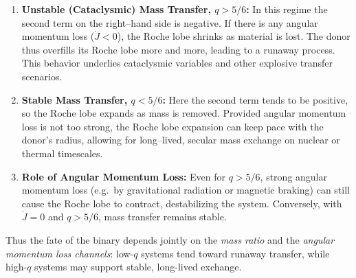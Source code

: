 \begin{enumerate}
    \item \textbf{Unstable (Cataclysmic) Mass Transfer, $q > 5/6$:}  
    In this regime the second term on the right--hand side is negative.  
    If there is any angular momentum loss ($\dot{J}<0$), the Roche lobe shrinks as material is lost.  
    The donor thus overfills its Roche lobe more and more, leading to a runaway process.  
    This behavior underlies cataclysmic variables and other explosive transfer scenarios.

    \item \textbf{Stable Mass Transfer, $q < 5/6$:}  
    Here the second term tends to be positive, so the Roche lobe expands as mass is removed.  
    Provided angular momentum loss is not too strong, the Roche lobe expansion can keep pace with 
    the donor’s radius, allowing for long--lived, secular mass exchange on nuclear or thermal timescales.  

    \item \textbf{Role of Angular Momentum Loss:}  
    Even for $q > 5/6$, strong angular momentum loss (e.g.\ by gravitational radiation or magnetic braking) 
    can still cause the Roche lobe to contract, destabilizing the system.  
    Conversely, with $\dot{J}=0$ and $q > 5/6$, mass transfer remains stable.
\end{enumerate}

\noindent
Thus the fate of the binary depends jointly on the \emph{mass ratio} and the \emph{angular momentum loss channels}:  
low-$q$ systems tend toward runaway transfer, while high-$q$ systems may support stable, long-lived exchange.

